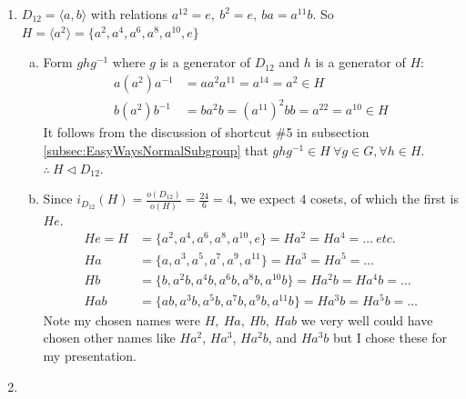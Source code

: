 \begin{enumerate}
    \item $D_{12}= \langle a,b \rangle$ with relations $a^{12}=e, \ b^2=e, \ ba=a^{11}b$. So $H=\langle a^2 \rangle = \{a^2, a^4, a^6, a^8, a^{10}, e \}$
    \begin{enumerate}[a)]
        \item Form $ghg^{-1}$ where $g$ is a generator of $D_{12}$ and $h$ is a generator of $H$:
        \begin{align*}
            a(a^2)a^{-1} &= aa^2a^{11} = a^{14} = a^2 \in H \\
            b(a^2)b^{-1} &= ba^2b = (a^{11})^2bb = a^{22} = a^{10} \in H
        \end{align*}
        It follows from the discussion of shortcut \#5 in subsection \ref{subsec:EasyWaysNormalSubgroup} that $ghg^{-1}\in H \ \forall g \in G, \forall h \in H$.\\
        $\therefore \ H \triangleleft D_{12}$.
        \item Since $i_{D_{12}}(H) = \frac{o(D_{12})}{o(H)} = \frac{24}{6}= 4$, we expect $4$ cosets, of which the first is $He$.
        \begin{align*}
            He = H &= \{a^2, a^4, a^6, a^8, a^{10}, e\} = Ha^2 = Ha^4 = \dots \ etc. \\
            Ha &= \{a, a^3, a^5, a^7, a^9, a^{11}\} = Ha^3 = Ha^5 = \dots  \\
            Hb &= \{b, a^2b, a^4b, a^6b, a^8b, a^{10}b\} = Ha^2b = Ha^4b = \dots \\
            Hab &= \{ab, a^3b, a^5b, a^7b, a^9b, a^{11}b\} = Ha^3b = Ha^5b = \dots 
        \end{align*}
        Note my chosen names were $H, \ Ha, \ Hb, \ Hab$ we very well could have chosen other names like $Ha^2$, $Ha^3$, $Ha^2b$, and $Ha^3b$ but I chose these for my presentation.
    \end{enumerate}
    \newpage 
    \item 


\end{enumerate}
